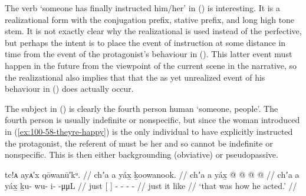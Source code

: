 The verb  ‘someone has finally instructed him/her’ in (\lastx) is interesting.
It is a realizational form with the  conjugation prefix,  stative prefix, and long high tone  stem.
It is not exactly clear why the realizational is used instead of the perfective, but perhaps the intent is to place the event of instruction at some distance in time from the event of the protagonist’s behaviour in (\nextx).
This latter event must happen in the future from the viewpoint of the current scene in the narrative, so the realizational also implies that that the as yet unrealized event of his behaviour in (\nextx) does actually occur.

The subject in (\lastx) is clearly the fourth person human  ‘someone, people’.
The fourth person is usually indefinite or nonspecific, but since the woman introduced in (\ref{ex:100-58-theyre-happy}) is the only individual to have explicitly instructed the protagonist, the referent of  must be her and so cannot be indefinite or nonspecific.
This  is then either backgrounding (obviative) or pseudopassive.

\ex\label{ex:100-69-so-he-did}%
%
\begingl
	\glpreamble	tc!ᴀ ayᴀ′x qōwanū′kᵘ. //
	\glpreamble	chʼa a yáx̱ ḵoowanook. //
	\gla	chʼa {} a yáx̱ {}
		 @ {} @ {} @ {} @ {} //
	\glb	chʼa {} a yáx̱ {}
		ḵu- wu- i-  -μμL //
	\glc	just {}[   {}]
		- - -  - //
	\gld	just {} it like {}
		 {} {} {} {} //
	\glft	‘that was how he acted.’
		//
\endgl
\xe

